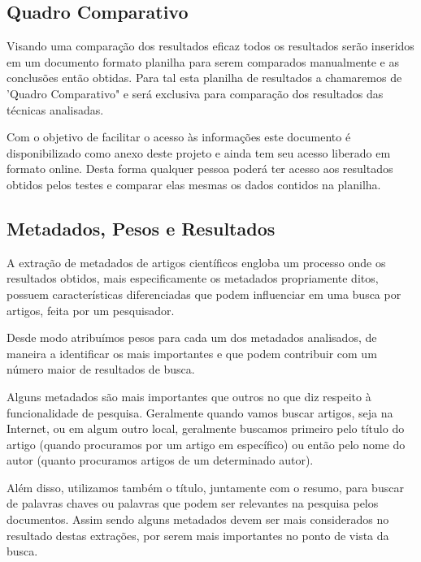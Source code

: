 \subsection{Quadro Comparativo}
\label{ssec:comparative-board}

Visando uma comparação dos resultados eficaz todos os resultados serão inseridos em um documento formato planilha para serem comparados manualmente e as conclusões então obtidas. Para tal esta planilha de resultados a chamaremos de 'Quadro Comparativo" e será exclusiva para comparação dos resultados das técnicas analisadas.


Com o objetivo de facilitar o acesso às informações este documento é disponibilizado como anexo deste projeto e ainda tem seu acesso liberado em formato online. Desta forma qualquer pessoa poderá ter acesso aos resultados obtidos pelos testes e comparar elas mesmas os dados contidos na planilha.

\subsection{Metadados, Pesos e Resultados}
\label{ssec:metadata-results}


A extração de metadados de artigos científicos engloba um processo onde os resultados obtidos, mais especificamente os metadados propriamente ditos, possuem características diferenciadas que podem influenciar em uma busca por artigos, feita por um pesquisador.

Desde modo atribuímos pesos para cada um dos metadados analisados, de maneira a identificar os mais importantes e que podem contribuir com um número maior de resultados de busca. 


Alguns metadados são mais importantes que outros no que diz respeito à funcionalidade de pesquisa. Geralmente quando vamos buscar artigos, seja na Internet, ou em algum outro local, geralmente buscamos primeiro pelo título do artigo (quando procuramos por um artigo em específico) ou então pelo nome do autor (quanto procuramos artigos de um determinado autor).

Além disso, utilizamos também o título, juntamente com o resumo, para buscar de palavras chaves ou palavras que podem ser relevantes na pesquisa pelos documentos. Assim sendo alguns metadados devem ser mais considerados no resultado destas extrações, por serem mais importantes no ponto de vista da busca.

